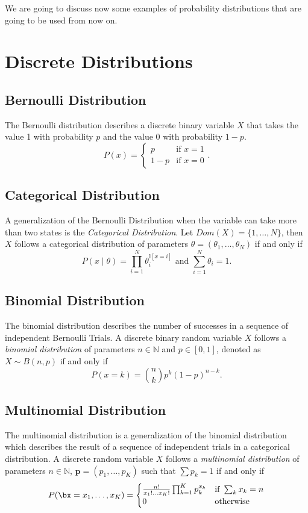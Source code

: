 We are going to discuss now some examples of probability distributions that are
going to be used from now on.

\section{Discrete Distributions}

\subsection*{Bernoulli Distribution}

The Bernoulli distribution describes a discrete binary variable \(X\) that takes
the value 1 with probability \(p\) and the value 0 with probability \(1-p\).
\[
  P(x) =
\left\{
  \begin{array}{ll}
    p  & \mbox{if } x = 1 \\
    1-p & \mbox{if } x = 0
  \end{array}.
\right.
\]

\subsection*{Categorical Distribution}

A generalization of the Bernoulli Distribution when the variable can take more than two states is the \emph{Categorical Distribution}. Let \(Dom(X) = \{1,\dots,N\}\), then \(X\) follows a categorical distribution of parameters \(\theta = (\theta_{1},\dots, \theta_{N})\) if and only if
\[
  P(x \mid \theta) = \prod_{i=1}^{N}\theta_{i}^{\mathbb{I}[x = i]} \text{ and } \sum_{i = 1}^{N}\theta_{i} = 1.
\]

\subsection*{Binomial Distribution}

The binomial distribution describes the number of successes in a sequence of
independent Bernoulli Trials. A discrete binary random variable \(X\) follows a
\emph{binomial distribution} of parameters \(n \in \mathbb{N}\) and \(p \in
[0,1]\), denoted as \(X \sim B(n, p)\) if and only if
\[
  P(x = k) = \binom{n}{k}p^k(1-p)^{n-k}.
\]


\subsection*{Multinomial Distribution}
The multinomial distribution is a generalization of the binomial distribution which describes the result of a sequence of independent trials in a categorical distribution. A discrete random variable \(X\) follows a \emph{multinomial distribution} of parameters \(n \in \mathbb{N}\), \(\bm{p} = (p_{1},\dots,p_{K})\) such that \(\sum p_{k} = 1\)  if and only if
\[
  P(\bx =x_{1},\dots,x_{K}) =
  \begin{cases}
    \frac{n!}{x_{1}!\dots x_{K}!}\prod_{k=1}^{K}p_{k}^{x_{k}} & \text{if } \sum_{k}{x_{k}} = n\\
    0 & \text{otherwise}
  \end{cases}
\]

